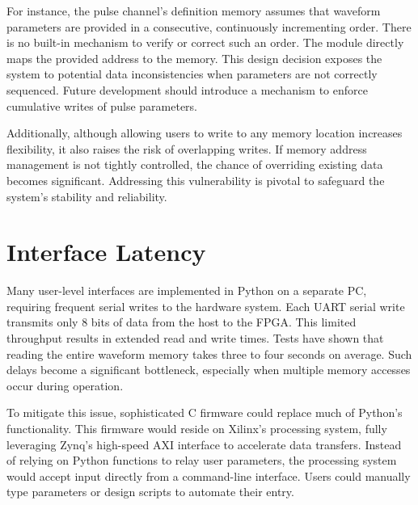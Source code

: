 For instance, the pulse channel's definition memory assumes that waveform parameters are provided in a consecutive, continuously incrementing order. There is no built-in mechanism to verify or correct such an order. The module directly maps the provided address to the memory. This design decision exposes the system to potential data inconsistencies when parameters are not correctly sequenced. Future development should introduce a mechanism to enforce cumulative writes of pulse parameters. 

Additionally, although allowing users to write to any memory location increases flexibility, it also raises the risk of overlapping writes. If memory address management is not tightly controlled, the chance of overriding existing data becomes significant. Addressing this vulnerability is pivotal to safeguard the system's stability and reliability.

\section{Interface Latency}
Many user-level interfaces are implemented in Python on a separate PC, requiring frequent serial writes to the hardware system. Each UART serial write transmits only 8 bits of data from the host to the FPGA. This limited throughput results in extended read and write times. Tests have shown that reading the entire waveform memory takes three to four seconds on average. Such delays become a significant bottleneck, especially when multiple memory accesses occur during operation.

To mitigate this issue, sophisticated C firmware could replace much of Python's functionality. This firmware would reside on Xilinx's processing system, fully leveraging Zynq's high-speed AXI interface to accelerate data transfers. Instead of relying on Python functions to relay user parameters, the processing system would accept input directly from a command-line interface. Users could manually type parameters or design scripts to automate their entry.